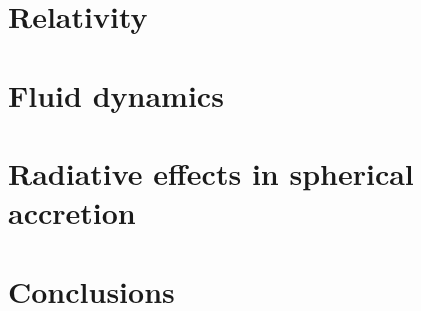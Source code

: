 \documentclass[a4paper, 11pt]{article}
\begin{document}
\section{Relativity} \label{sec:general-relativity}


\section{Fluid dynamics} \label{sec:fluid-dynamics}


\section{Radiative effects in spherical accretion} \label{sec:radiative-effects}


% 

\section{Conclusions} \label{sec:conclusions}


\printbibliography[title={Bibliography}]

\end{document}

